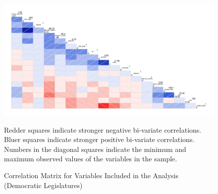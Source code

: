 \documentclass[a4paper]{article}\usepackage[]{graphicx}\usepackage[]{color}
\begin{document}
\begin{landscape}
\begin{figure}[t]

    \begin{center}

    \includegraphics[scale=0.5]{corrScatter.pdf}

    \end{center}

    \caption{Correlation Matrix for Variables Included in the Analysis (Democratic Legislatures)}
    \label{corrmatrix}

    \begin{singlespace}
        {\scriptsize{Redder squares indicate stronger negative bi-variate correlations. \\
        Bluer squares indicate stronger positive bi-variate correlations. \\
        Numbers in the diagonal squares indicate the minimum and maximum observed values of the variables in the sample.
        }}
    \end{singlespace}
\end{figure}
\end{landscape}




\end{document}
